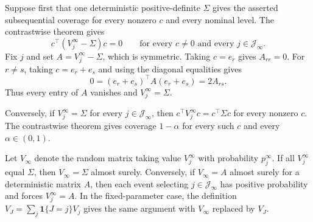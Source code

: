 Suppose first that one deterministic positive-definite \(\Sigma\) gives the asserted subsequential coverage for every nonzero \(c\) and every nominal level. The contrastwise theorem gives
\[
 c^\top(V_j^\infty-\Sigma)c=0
 \qquad\text{for every }c\ne0\text{ and every }j\in\mathcal J_\infty.
\]
Fix \(j\) and set \(A=V_j^\infty-\Sigma\), which is symmetric. Taking \(c=e_r\) gives \(A_{rr}=0\). For \(r\ne s\), taking \(c=e_r+e_s\) and using the diagonal equalities gives
\[
 0=(e_r+e_s)^\top A(e_r+e_s)=2A_{rs}.
\]
Thus every entry of \(A\) vanishes and \(V_j^\infty=\Sigma\).

Conversely, if \(V_j^\infty=\Sigma\) for every \(j\in\mathcal J_\infty\), then \(c^\top V_j^\infty c=c^\top\Sigma c\) for every nonzero \(c\). The contrastwise theorem gives coverage \(1-\alpha\) for every such \(c\) and every \(\alpha\in(0,1)\).

Let \(V_\infty\) denote the random matrix taking value \(V_j^\infty\) with probability \(p_j^\infty\). If all \(V_j^\infty\) equal \(\Sigma\), then \(V_\infty=\Sigma\) almost surely. Conversely, if \(V_\infty=A\) almost surely for a deterministic matrix \(A\), then each event selecting \(j\in\mathcal J_\infty\) has positive probability and forces \(V_j^\infty=A\). In the fixed-parameter case, the definition \(V_J=\sum_j\mathbf 1\{J=j\}V_j\) gives the same argument with \(V_\infty\) replaced by \(V_J\).